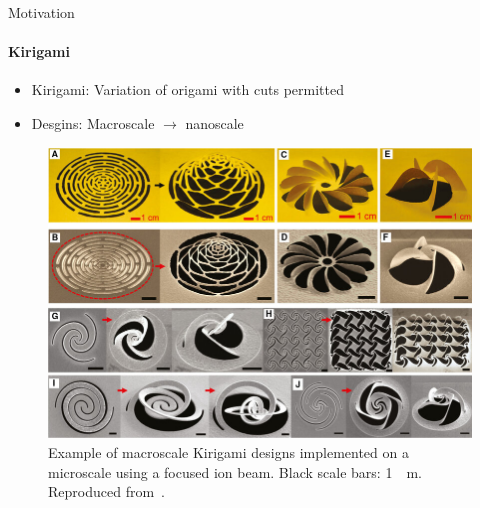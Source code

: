 \documentclass[
	10pt, %
]{beamer}
\begin{document}
\begin{frame}{Motivation}
	\framesubtitle{Kirigami}
	\begin{itemize}
		\item Kirigami: Variation of origami with cuts permitted
		\item Desgins: Macroscale $\to$ nanoscale
	\end{itemize}

	\begin{figure}
		\includegraphics[height=0.55\textheight]{figures/kirigami_example.jpg}
		\caption{Example of macroscale Kirigami designs implemented on a microscale using a focused ion beam. Black scale bars: \SI{1}{\mu m}. Reproduced from~\cite{Li_2018}.}
	\end{figure}	
\end{frame}
%
%
\end{document}
